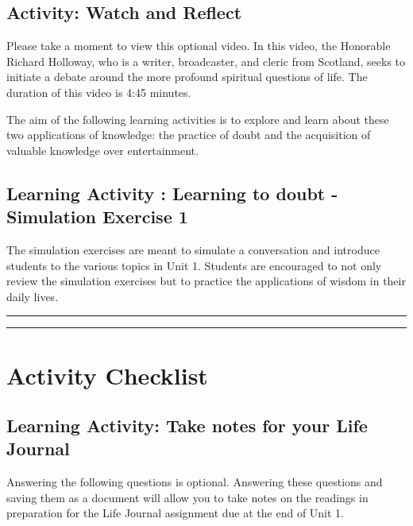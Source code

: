 \documentclass[
]{book}
\begin{document}
\hypertarget{activity-watch-and-reflect-1}{%
\subsection*{Activity: Watch and Reflect}\label{activity-watch-and-reflect-1}}

\begin{reflect}
Please take a moment to view this optional video. In this video, the Honorable Richard Holloway, who is a writer, broadcaster, and cleric from Scotland, seeks to initiate a debate around the more profound spiritual questions of life. The duration of this video is 4:45 minutes.
\end{reflect}

The aim of the following learning activities is to explore and learn about these two applications of knowledge: the practice of doubt and the acquisition of valuable knowledge over entertainment.

\hypertarget{learning-activity-learning-to-doubt---simulation-exercise-1}{%
\subsection{Learning Activity : Learning to doubt - Simulation Exercise 1}\label{learning-activity-learning-to-doubt---simulation-exercise-1}}

The simulation exercises are meant to simulate a conversation and introduce students to the various topics in Unit 1. Students are encouraged to not only review the simulation exercises but to practice the applications of wisdom in their daily lives.

\begin{center}\rule{0.5\linewidth}{0.5pt}\end{center}

\begin{center}\rule{0.5\linewidth}{0.5pt}\end{center}

\hypertarget{activity-checklist}{%
\section*{Activity Checklist}\label{activity-checklist}}

\begin{reflect}
\hypertarget{learning-activity-take-notes-for-your-life-journal-1}{%
\subsection{Learning Activity: Take notes for your Life Journal}\label{learning-activity-take-notes-for-your-life-journal-1}}

Answering the following questions is optional. Answering these questions and saving them as a document will allow you to take notes on the readings in preparation for the Life Journal assignment due at the end of Unit 1.
\end{reflect}
\end{document}

